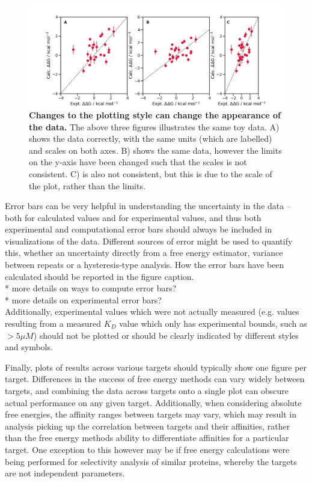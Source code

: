 \documentclass[9pt,bestpractices]{livecoms}
\begin{document}
\begin{figure}
    \includegraphics[width=0.95\linewidth]{figures/plotting-basics.png}
    \caption{\textbf{Changes to the plotting style can change the appearance of the data.} The above three figures illustrates the same toy data. A) shows the data correctly, with the same units (which are labelled) and scales on both axes. B) shows the same data, however the limits on the y-axis have been changed such that the scales is not consistent. C) is also not consistent, but this is due to the scale of the plot, rather than the limits.}
    \label{fig:plotting-basics}
\end{figure}

Error bars can be very helpful in understanding the uncertainty in the data -- both for calculated values and for experimental values, and thus both experimental and computational error bars should always be included in visualizations of the data. Different sources of error might be used to quantify this, whether an uncertainty directly from a free energy estimator, variance between repeats or a hysteresis-type analysis. How the error bars have been calculated should be reported in the figure caption.\\
* more details on ways to compute error bars?\\
* more details on experimental error bars?\\
Additionally, experimental values which were not actually measured (e.g. values resulting from a measured $K_D$ value which only has experimental bounds, such as $> 5 \mu M$) should not be plotted or should be clearly indicated by different styles and symbols.

Finally, plots of results across various targets should typically show one figure per target. Differences in the success of free energy methods can vary widely between targets, and combining the data across targets onto a single plot can obscure actual performance on any given target. Additionally, when considering absolute free energies, the affinity ranges between targets may vary, which may result in analysis picking up the correlation between targets and their affinities, rather than the free energy methods ability to differentiate affinities for a particular target. One exception to this however may be if free energy calculations were being performed for selectivity analysis of similar proteins, whereby the targets are not independent parameters.
\end{document}
